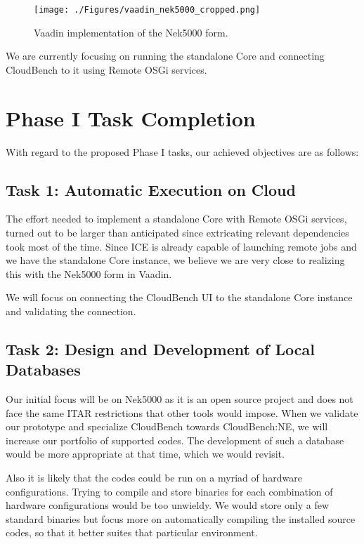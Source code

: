 \begin{figure}[!thb]
\begin{center}
\leavevmode
\texttt{[image: ./Figures/vaadin\_nek5000\_cropped.png]}
\end{center}
\caption{Vaadin implementation of the Nek5000 form.}
\label{fig:vaddin_nek5000}
\end{figure}

We are currently focusing on running the standalone Core and connecting 
CloudBench to it using Remote OSGi services.

\section{Phase I Task Completion}
With regard to the proposed Phase I tasks, our achieved objectives are as 
follows:

\subsection{Task 1: Automatic Execution on Cloud}
The effort needed to implement a standalone Core with Remote OSGi services, 
turned out to be larger than anticipated since extricating relevant 
dependencies took most of the time. Since ICE is already capable of launching 
remote jobs and we have the standalone Core instance, we believe we are very 
close to realizing this with the Nek5000 form in Vaadin.

We will focus on connecting the CloudBench UI to the standalone Core instance 
and validating the connection.

\subsection{Task 2: Design and Development of Local Databases}
Our initial focus will be on Nek5000 as it is an open source project and does 
not face the same ITAR restrictions that other tools would impose. When we 
validate our prototype and specialize CloudBench towards CloudBench:NE, we will 
increase our portfolio of supported codes. The development of such a database 
would be more appropriate at that time, which we would revisit.

Also it is likely that the codes could be run on a myriad of hardware 
configurations. Trying to compile and store binaries for each combination of 
hardware configurations would be too unwieldy. We would store only a few 
standard binaries but focus more on automatically compiling the installed 
source codes, so that it better suites that particular environment.

